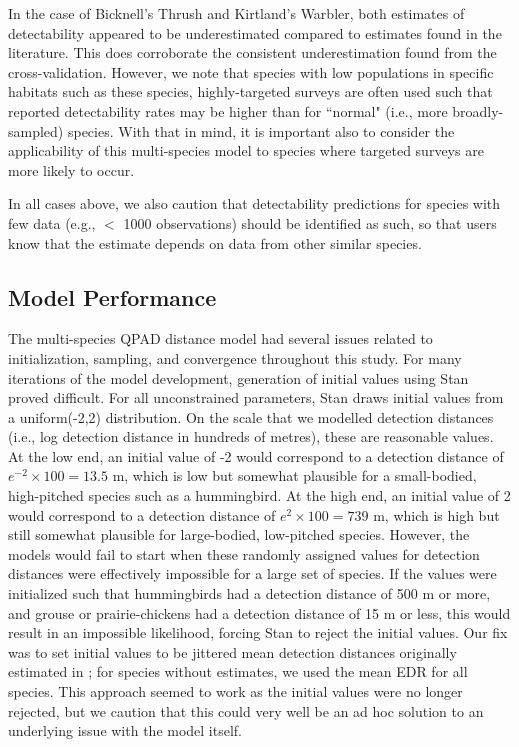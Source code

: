 \documentclass[12pt]{article}
\begin{document}
\par In the case of Bicknell's Thrush and Kirtland's Warbler, both estimates of detectability appeared to be underestimated compared to estimates found in the literature.
This does corroborate the consistent underestimation found from the cross-validation.
However, we note that species with low populations in specific habitats such as these species, highly-targeted surveys are often used such that reported detectability rates may be higher than for ``normal" (i.e., more broadly-sampled) species.
With that in mind, it is important also to consider the applicability of this multi-species model to species where targeted surveys are more likely to occur.

In all cases above, we also caution that detectability predictions for species with few data (e.g., $<$ 1000 observations) should be identified as such, so that users know that the estimate depends on data from other similar species.


\subsection{Model Performance}

\par The multi-species QPAD distance model had several issues related to initialization, sampling, and convergence throughout this study.
For many iterations of the model development, generation of initial values using Stan proved difficult.
For all unconstrained parameters, Stan draws initial values from a uniform(-2,2) distribution.
On the scale that we modelled detection distances (i.e., log detection distance in hundreds of metres), these are reasonable values.
At the low end, an initial value of -2 would correspond to a detection distance of $e^{-2} \times 100 = 13.5$ m, which is low but somewhat plausible for a small-bodied, high-pitched species such as a hummingbird.
At the high end, an initial value of 2 would correspond to a detection distance of $e^{2} \times 100 = 739$ m, which is high but still somewhat plausible for large-bodied, low-pitched species.
However, the models would fail to start when these randomly assigned values for detection distances were effectively impossible for a large set of species.
If the values were initialized such that hummingbirds had a detection distance of 500 m or more, and grouse or prairie-chickens had a detection distance of 15 m or less, this would result in an impossible likelihood, forcing Stan to reject the initial values.
Our fix was to set initial values to be jittered mean detection distances originally estimated in \citet{edwards_point_2023}; for species without estimates, we used the mean EDR for all species.
This approach seemed to work as the initial values were no longer rejected, but we caution that this could very well be an ad hoc solution to an underlying issue with the model itself.
\end{document}
